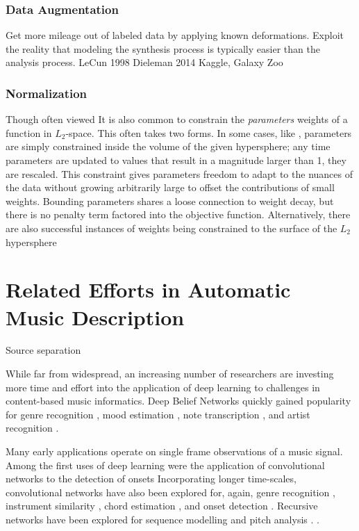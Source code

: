 \subsubsection{Data Augmentation}

Get more mileage out of labeled data by applying known deformations.
Exploit the reality that modeling the synthesis process is typically easier than the analysis process.
LeCun 1998
Dieleman 2014 Kaggle, Galaxy Zoo


\subsubsection{Normalization}


Though often viewed It is also common to constrain the \emph{parameters} weights of a function in $L_2$-space.
This often takes two forms.
In some cases, like \cite{HintonDropout}, parameters are simply constrained inside the volume of the given hypersphere; any time parameters are updated to values that result in a magnitude larger than 1, they are rescaled.
This constraint gives parameters freedom to adapt to the nuances of the data without growing arbitrarily large to offset the contributions of small weights.
Bounding parameters shares a loose connection to weight decay, but there is no penalty term factored into the objective function.
Alternatively, there are also successful instances of weights being constrained to the surface of the $L_2$ hypersphere \cite{LeCun}





\section{Related Efforts in Automatic Music Description}

Source separation

While far from widespread, an increasing number of researchers are investing more time and effort into the application of deep learning to challenges in content-based music informatics.
Deep Belief Networks quickly gained popularity for genre recognition \cite{Hamel2009}, mood estimation \cite{Schmidt2011}, note transcription \cite{Nam2011}, and artist recognition \cite{Dieleman2011}.

Many early applications operate on single frame observations of a music signal.
Among the first uses of deep learning were the application of convolutional networks to the detection of onsets \cite{Lacoste2007}
Incorporating longer time-scales, convolutional networks have also been explored for, again, genre recognition \cite{Li2010}, instrument similarity \cite{Humphrey2010}, chord estimation \cite{Humphrey2011, Humphrey2012b}, and onset detection \cite{Schluter2014}.
Recursive networks have been explored for sequence modelling \cite{Boulanger2013} and pitch analysis \cite{Sigtia2014}.
\cite{Cherla2014}.
\cite{Durand2015}


